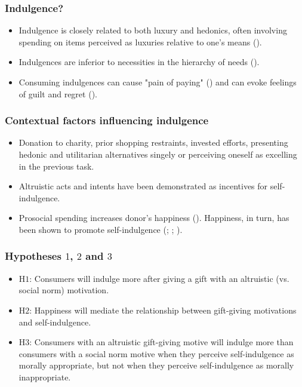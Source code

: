\documentclass[11pt]{beamer}
\begin{document}
\begin{frame}[t]
\frametitle{Indulgence?}
\begin{itemize}
\item<+-> Indulgence is closely related to both luxury and hedonics, often involving spending on items perceived as luxuries relative to one’s means (\cite{kivetz2002}).
\item<+-> Indulgences are inferior to necessities in the hierarchy of needs (\cite{maslow1970}).
\item<+-> Consuming indulgences can cause "pain of paying" (\cite{prelec1998}) and can evoke feelings of guilt and regret (\cite{strahilevitz1998}).
\end{itemize}
\note{~}
\end{frame}


\begin{frame}[t]
\frametitle{Contextual factors influencing indulgence}
\begin{itemize}
\item<+-> Donation to charity, prior shopping restraints, invested efforts, presenting hedonic and utilitarian alternatives singely or perceiving oneself as excelling in the previous task.
\item<+-> Altruistic acts and intents have been demonstrated as incentives for self-indulgence.
\item<+-> Prosocial spending increases donor’s happiness (\cite{Dunn2008}). Happiness, in turn, has been shown to promote self-indulgence (\cite{Perry1985}; \cite{Rosenhan1974}; \cite{Mischel1968}).
\end{itemize}
\note{~}
\end{frame}



\begin{frame}[t]
\frametitle{Hypotheses $1$, $2$ and $3$}
\begin{itemize}
\item<+-> H$1$: Consumers will indulge more after giving a gift with an altruistic (vs. social norm) motivation.
\item<+-> H$2$: Happiness will mediate the relationship between gift-giving motivations and self-indulgence.
\item<+-> H$3$: Consumers with an altruistic gift-giving motive will indulge more than consumers with a social norm motive when they perceive self-indulgence as morally appropriate, but not when they perceive self-indulgence as morally inappropriate.
\end{itemize}
\note{~}
\end{frame}
\end{document}
